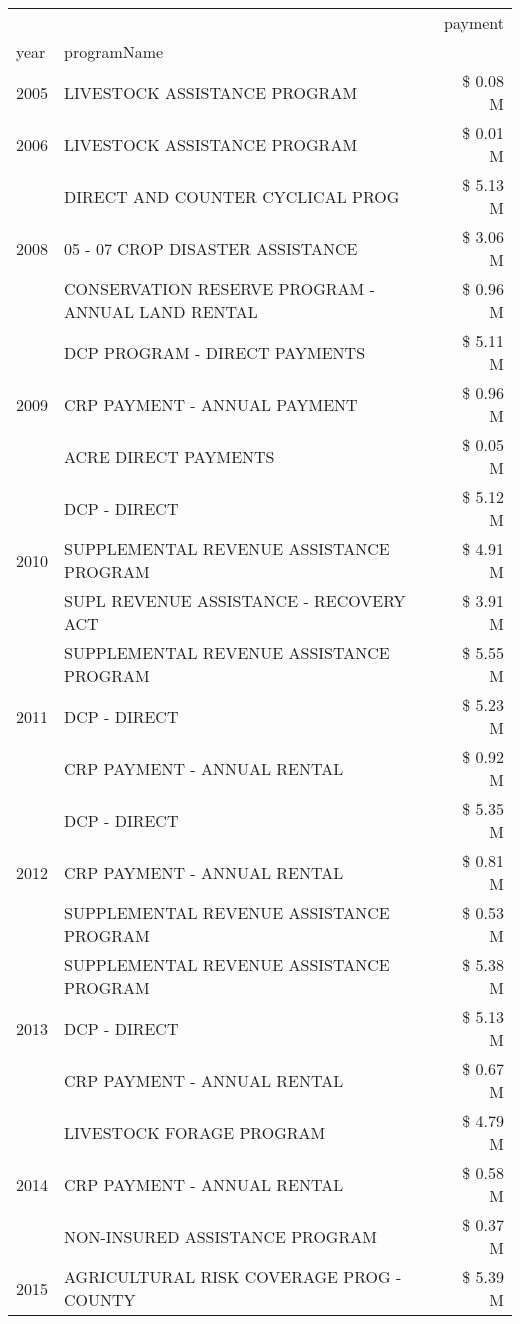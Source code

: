 \begin{tabular}{llr}
\toprule
 &  & payment \\
year & programName &  \\
\midrule
2005 & LIVESTOCK ASSISTANCE PROGRAM & \$ 0.08 M \\
\cline{1-3}
2006 & LIVESTOCK ASSISTANCE PROGRAM & \$ 0.01 M \\
\cline{1-3}
\multirow[t]{3}{*}{2008} & DIRECT AND COUNTER CYCLICAL PROG & \$ 5.13 M \\
 & 05 - 07 CROP DISASTER ASSISTANCE & \$ 3.06 M \\
 & CONSERVATION RESERVE PROGRAM - ANNUAL LAND RENTAL & \$ 0.96 M \\
\cline{1-3}
\multirow[t]{3}{*}{2009} & DCP PROGRAM - DIRECT PAYMENTS & \$ 5.11 M \\
 & CRP PAYMENT - ANNUAL PAYMENT & \$ 0.96 M \\
 & ACRE DIRECT PAYMENTS & \$ 0.05 M \\
\cline{1-3}
\multirow[t]{3}{*}{2010} & DCP - DIRECT & \$ 5.12 M \\
 & SUPPLEMENTAL REVENUE ASSISTANCE PROGRAM & \$ 4.91 M \\
 & SUPL REVENUE ASSISTANCE - RECOVERY ACT & \$ 3.91 M \\
\cline{1-3}
\multirow[t]{3}{*}{2011} & SUPPLEMENTAL REVENUE ASSISTANCE PROGRAM & \$ 5.55 M \\
 & DCP - DIRECT & \$ 5.23 M \\
 & CRP PAYMENT - ANNUAL RENTAL & \$ 0.92 M \\
\cline{1-3}
\multirow[t]{3}{*}{2012} & DCP - DIRECT & \$ 5.35 M \\
 & CRP PAYMENT - ANNUAL RENTAL & \$ 0.81 M \\
 & SUPPLEMENTAL REVENUE ASSISTANCE PROGRAM & \$ 0.53 M \\
\cline{1-3}
\multirow[t]{3}{*}{2013} & SUPPLEMENTAL REVENUE ASSISTANCE PROGRAM & \$ 5.38 M \\
 & DCP - DIRECT & \$ 5.13 M \\
 & CRP PAYMENT - ANNUAL RENTAL & \$ 0.67 M \\
\cline{1-3}
\multirow[t]{3}{*}{2014} & LIVESTOCK FORAGE PROGRAM & \$ 4.79 M \\
 & CRP PAYMENT - ANNUAL RENTAL & \$ 0.58 M \\
 & NON-INSURED ASSISTANCE PROGRAM & \$ 0.37 M \\
\cline{1-3}
\multirow[t]{3}{*}{2015} & AGRICULTURAL RISK COVERAGE PROG - COUNTY & \$ 5.39 M \\

\end{tabular}
